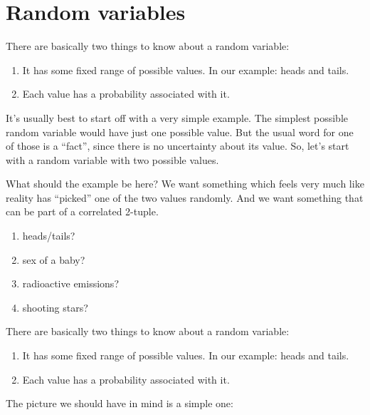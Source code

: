 \section{Random variables}

There are basically two things to know about a random variable:
\begin{enumerate}
\item It has some fixed range of possible values. In our example: heads and tails.
\item Each value has a probability associated with it.
\end{enumerate}

It's usually best to start off with a very simple example. The simplest possible random variable would have
just one possible value. But the usual word for one of those is a ``fact​'', since there is no uncertainty about
its value. So, let's start with a random variable with two possible values.



What should the example be here? We want something which feels very much like reality has ``picked​'' one of the
two values randomly. And we want something that can be part of a correlated 2-tuple.

\begin{enumerate}
\item heads/tails?
\item sex of a baby?
\item radioactive emissions?
\item shooting stars?
\end{enumerate}


There are basically two things to know about a random variable:
\begin{enumerate}
\item It has some fixed range of possible values. In our example: heads and tails.
\item Each value has a probability associated with it.
\end{enumerate}


The picture we should have in mind is a simple one:

